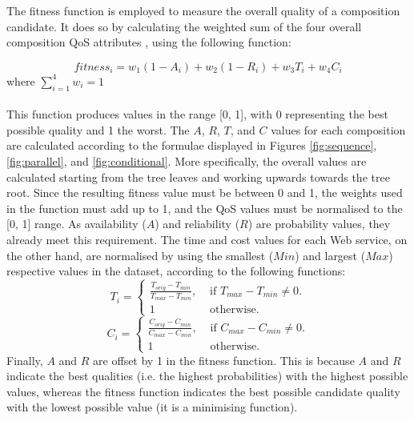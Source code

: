 \documentclass[conference]{IEEEtran}
\begin{document}
The fitness function is employed to measure the overall quality of a composition candidate. It does so by calculating the weighted sum of the four overall composition QoS attributes \cite{silva2014graph}, using the following function:

\vspace{-0.6cm}
\begin{equation}
fitness_i = w_1(1 - A_i) + w_2(1 - R_i) + w_3T_i + w_4C_i
\end{equation}
\vspace{-0.3cm}
\noindent where $\sum_{i=1}^{4} w_i = 1$
\vspace{-0.3cm}
\\\\

This function produces values in the range [0, 1], with 0 representing the best possible quality and 1 the worst. The $A$, $R$, $T$, and $C$ values for each composition are calculated according to the formulae displayed in Figures \ref{fig:sequence}, \ref{fig:parallel}, and \ref{fig:conditional}. More specifically, the overall values are calculated starting from the tree leaves and working upwards towards the tree root. Since the resulting fitness value must be between 0 and 1, the weights used in the function must add up to 1, and the QoS values must be normalised to the [0, 1] range. As availability ($A$) and reliability ($R$) are probability values, they already meet this requirement. The time and cost values for each Web service, on the other hand, are normalised by using the smallest ($Min$) and largest ($Max$) respective values in the dataset, according to the following functions:
\begin{equation}
T_i = \begin{cases}
     \frac{T_{orig} - T_{min}}{T_{max} - T_{min}}, & \text{ if $T_{max} - T_{min} \neq 0$}.\\
     1 & \text{ otherwise}.
    \end{cases}
\end{equation}
\begin{equation}
C_i = \begin{cases}
     \frac{C_{orig} - C_{min}}{C_{max} - C_{min}}, & \text{ if $C_{max} - C_{min} \neq 0$}.\\
     1 & \text{ otherwise}.
    \end{cases}
\end{equation}
Finally, $A$ and $R$ are offset by 1 in the fitness function. This is because $A$ and $R$ indicate the best qualities (i.e. the highest probabilities) with the highest possible values, whereas the fitness function indicates the best possible candidate quality with the lowest possible value (it is a minimising function).
\end{document}
